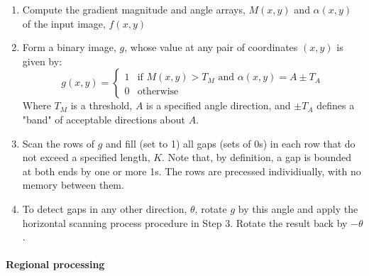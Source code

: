 \begin{enumerate}
	\item Compute the gradient magnitude and angle arrays, $M(x,y)$ and $\alpha(x,y)$ of the input image, $f(x,y)$
	\item Form a binary image, $g$, whose value at any pair of coordinates $(x,y)$ is given by:
		\[
			g(x,y) = 
				\begin{cases}
					1 & \text{if } M(x,y) > T_M \text{ and } \alpha(x,y) = A \pm T_A\\
					0 & \text{otherwise}
				\end{cases}
		\]
		Where $T_M$ is a threshold, $A$ is a specified angle direction, and $\pm T_A$ defines a "band" of acceptable directions about $A$.
	\item Scan the rows of $g$ and fill (set to 1) all gaps (sets of 0s) in each row that do not exceed a specified length, $K$.
		Note that, by definition, a gap is bounded at both ends by one or more 1s. 
		The rows are precessed individiually, with no memory between them.
	\item To detect gaps in any other direction, $\theta$, rotate $g$ by this angle and apply the horizontal scanning process procedure in Step 3.
		Rotate the result back by $-\theta$.
\end{enumerate}


\paragraph{Regional processing}

